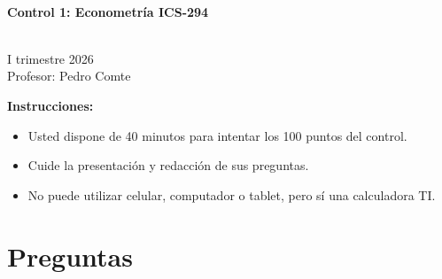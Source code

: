 \documentclass[10pt,a4paper]{article}
\begin{document}
\vspace{5cm}



\begin{center}
\begin{large}
\textbf{\\Control 1: Econometría ICS-294}
\end{large}\\
\vspace{0.2cm}
I trimestre 2026\\
Profesor: Pedro Comte\\
\end{center}

\textbf{Instrucciones:} 

\begin{itemize}

    \item Usted dispone de 40 minutos  para intentar los 100 puntos del control.
    \item Cuide la presentación y redacción de sus preguntas.
    \item No puede utilizar celular, computador o tablet, pero sí una calculadora TI.
     
\end{itemize}

\section{Preguntas}
\end{document}
